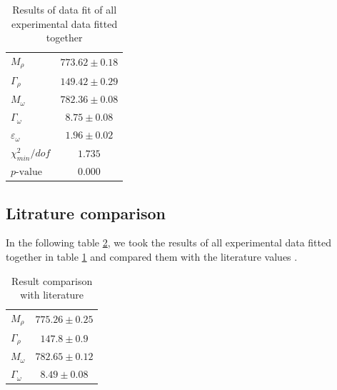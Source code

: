 \documentclass[a4paper]{article}
\begin{document}
\begin{table}[h!]
    \caption{Results of data fit of all experimental data fitted together\label{tabmulti}}
    \centering
    \begin{tabular}{|l|c|}
        \hline
        $M_{\rho}$              & $773.62	\pm 0.18$   \\
        $\Gamma_{\rho}$         & $149.42	\pm 0.29$  \\
        $M_{\omega}$            & $782.36	\pm 0.08$  \\
        $\Gamma_{\omega}$       & $8.75	\pm 0.08    $  \\
        $\varepsilon_{\omega}$  & $1.96	\pm 0.02    $  \\
        \hline
        $\chi^2_{min}/dof$      & $1.735$\\
        $p\text{-value}$        & $0.000$\\
        \hline

    \end{tabular}
\end{table}

\subsection{Litrature comparison}
In the following table \ref{tabref}, we took the results of all experimental data fitted together
in table \ref{tabmulti} and compared them with the literature values \cite{particleref}.
\begin{table}[ht!]
    \caption{Result comparison with literature\label{tabref}}
    \centering
    \begin{tabular}{|l|c|}
        \hline
        $M_{\rho}$              & $775.26	\pm 0.25$   \\
        $\Gamma_{\rho}$         & $147.8	\pm 0.9$  \\
        $M_{\omega}$            & $782.65	\pm 0.12$  \\
        $\Gamma_{\omega}$       & $8.49	\pm 0.08    $\\
        \hline
    \end{tabular}
\end{table}
\end{document}
